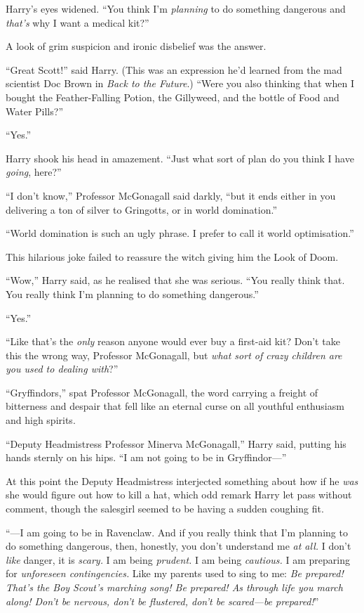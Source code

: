 Harry’s eyes widened. “You think I’m \emph{planning} to do something dangerous and \emph{that’s} why I want a medical kit?”

A look of grim suspicion and ironic disbelief was the answer.

“Great Scott!” said Harry. (This was an expression he’d learned from the mad scientist Doc Brown in \emph{Back to the Future}.) “Were you also thinking that when I bought the Feather-Falling Potion, the Gillyweed, and the bottle of Food and Water Pills?”

“Yes.”

Harry shook his head in amazement. “Just what sort of plan do you think I have \emph{going}, here?”

“I don’t know,” Professor McGonagall said darkly, “but it ends either in you delivering a ton of silver to Gringotts, or in world domination.”

“World domination is such an ugly phrase. I prefer to call it world optimisation.”

This hilarious joke failed to reassure the witch giving him the Look of Doom.

“Wow,” Harry said, as he realised that she was serious. “You really think that. You really think I’m planning to do something dangerous.”

“Yes.”

“Like that’s the \emph{only} reason anyone would ever buy a first-aid kit? Don’t take this the wrong way, Professor McGonagall, but \emph{what sort of crazy children are you used to dealing with}?”

“Gryffindors,” spat Professor McGonagall, the word carrying a freight of bitterness and despair that fell like an eternal curse on all youthful enthusiasm and high spirits.

“Deputy Headmistress Professor Minerva McGonagall,” Harry said, putting his hands sternly on his hips. “I am not going to be in Gryffindor—”

At this point the Deputy Headmistress interjected something about how if he \emph{was} she would figure out how to kill a hat, which odd remark Harry let pass without comment, though the salesgirl seemed to be having a sudden coughing fit.

“—I am going to be in Ravenclaw. And if you really think that I’m planning to do something dangerous, then, honestly, you don’t understand me \emph{at all.} I don’t \emph{like} danger, it is \emph{scary.} I am being \emph{prudent.} I am being \emph{cautious.} I am preparing for \emph{unforeseen contingencies.} Like my parents used to sing to me: \emph{Be prepared! That’s the Boy Scout’s marching song! Be prepared! As through life you march along! Don’t be nervous, don’t be flustered, don’t be scared—be prepared!}”

